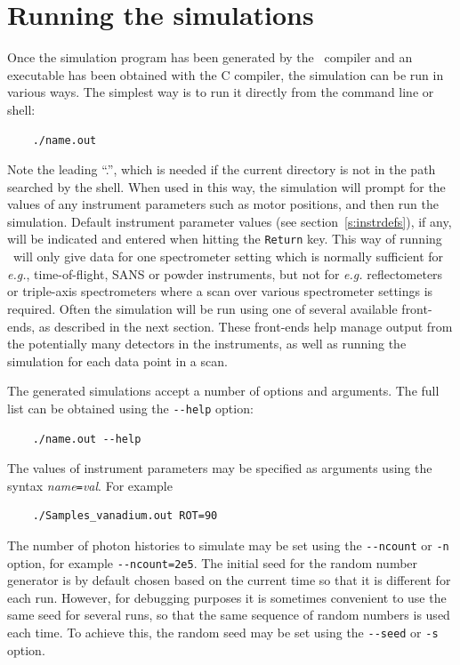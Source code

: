 \section{Running the simulations}
\label{s:run-sim}

Once the simulation program has been generated by the \MCX\ compiler
and an executable has been obtained with the C compiler, the simulation
can be run in various ways. The simplest way is to run it directly from the
command line or shell:
\begin{verbatim}
    ./name.out
\end{verbatim}
Note the leading ``.'', which is needed if the current directory is not in
the path searched by the shell. When used in this way, the simulation
will prompt for the values of any instrument parameters such as motor
positions, and then run the simulation. Default instrument parameter values (see section~\ref{s:instrdefs}), if any, will be indicated and entered when hitting the \verb+Return+ key.
This way of running \MCX\ will only give data for one spectrometer
setting which is normally sufficient for {\em e.g.}, time-of-flight,
SANS or powder instruments, but not for {\em e.g.} reflectometers or triple-axis spectrometers where a scan over
various spectrometer settings is required.
Often the simulation will be run using one of several
available front-ends, as described in the next section. These front-ends
help manage output from the potentially many detectors in the
instruments, as well as running the simulation for each data point in
a scan.

The generated simulations accept a number of options and arguments. The
full list can be obtained using the \verb+--help+ option:
\begin{verbatim}
    ./name.out --help
\end{verbatim}
The values of instrument parameters may be specified as arguments using
the syntax \textit{name}\verb+=+\textit{val}. For example
\begin{verbatim}
    ./Samples_vanadium.out ROT=90
\end{verbatim}
The number of photon histories to simulate may be set using the
\verb+--ncount+ or \verb+-n+ option, for example
\verb+--ncount=2e5+. The initial seed for the random number generator is
by default chosen based on the current time so that it is different for
each run. However, for debugging purposes it is sometimes convenient to
use the same seed for several runs, so that the same sequence of random
numbers is used each time. To achieve this, the random seed may be set
using the \verb+--seed+ or \verb+-s+ option.

